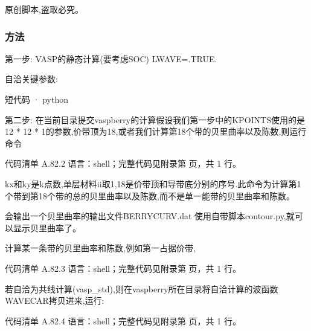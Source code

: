 \documentclass[lang=cn,scheme=chinese,color=blue,device=normal,toc=onecol,math=cm]{elegantbook}
\begin{document}
原创脚本,盗取必究。\par


\subsubsection{方法}


第一步: VASP的静态计算(要考虑SOC) LWAVE=.TRUE.\par


自洽关键参数:\par


\begin{inlinecodebox}{短代码 · python}
\end{inlinecodebox}


第二步: 在当前目录提交vaspberry的计算假设我们第一步中的KPOINTS使用的是12 * 12 * 1的参数,价带顶为18,或者我们计算第18个带的贝里曲率以及陈数,则运行命令\par


\begin{codeindexbox}{代码清单 A.82.2}
语言：shell；完整代码见附录第 \pageref{code:82:2} 页，共 1 行。
\end{codeindexbox}


kx和ky是k点数,单层材料ii取1,18是价带顶和导带底分别的序号.此命令为计算第1个带到第18个带的总的贝里曲率以及陈数,而不是单一能带的贝里曲率和陈数。\par


会输出一个贝里曲率的输出文件BERRYCURV.dat 使用自带脚本contour.py,就可以显示贝里曲率了。\par


计算某一条带的贝里曲率和陈数,例如第一占据价带,\par


\begin{codeindexbox}{代码清单 A.82.3}
语言：shell；完整代码见附录第 \pageref{code:82:3} 页，共 1 行。
\end{codeindexbox}


若自洽为共线计算(vasp\_\allowbreak{}std),则在vaspberry所在目录将自洽计算的波函数WAVECAR拷贝进来,运行:\par


\begin{codeindexbox}{代码清单 A.82.4}
语言：shell；完整代码见附录第 \pageref{code:82:4} 页，共 1 行。
\end{codeindexbox}
\end{document}
